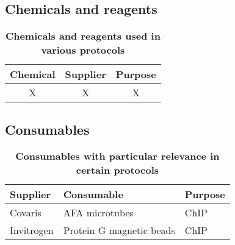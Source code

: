 \documentclass[11pt,twoside,a4paper]{report}
\begin{document}
		\subsection{Chemicals and reagents}
		
			\begin{table}[H]
       		\caption{\bf{Chemicals and reagents used in various protocols}}
        		\begin{center}
            		\begin{tabular}{|c|c|c|}
                		\hline
	                Chemical & Supplier & Purpose\\
    		            \hline
        		        X & X & X\\
	                \hline
	            \end{tabular}
    		    \end{center}
		    \end{table}
    
	    \subsection{Consumables}
			\begin{table}[H]
       			\caption{\bf{Consumables with particular relevance in certain protocols}}
        		\begin{center}
            		\begin{tabular}{| p{2cm} | p{8cm} | p{3cm} |}
                		\hline
	                	\textbf{Supplier} & \textbf{Consumable} &  \textbf{Purpose}\\
    		            \hline
    		            Covaris & AFA microtubes & ChIP\\
        		        Invitrogen & Protein G magnetic beads & ChIP\\
        		        \hline
	            \end{tabular}
    		    \end{center}
		    \end{table}
    
\end{document}

